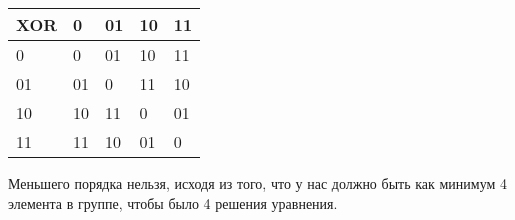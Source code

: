 \documentclass[a4paper,14pt]{article} %
\begin{document}
\begin{table}[H]
	\begin{tabular}{|l|l|l|l|l|}
	\hline
	XOR & 0  & 01 & 10 & 11 \\ \hline
	0   & 0  & 01 & 10 & 11 \\ \hline
	01  & 01 & 0  & 11 & 10 \\ \hline
	10  & 10 & 11 & 0  & 01 \\ \hline
	11  & 11 & 10 & 01 & 0  \\ \hline
	\end{tabular}
\end{table}

Меньшего порядка нельзя, исходя из того, что у нас должно быть как минимум 4 элемента в группе, чтобы было 4 решения уравнения.
\end{document}

